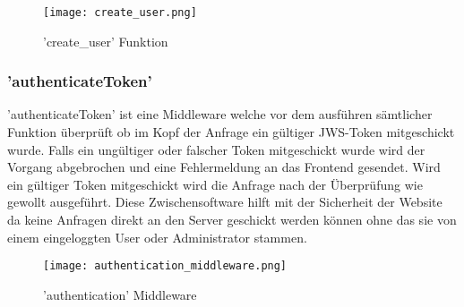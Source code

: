 		 		\begin{figure}[h]
		 			\centering
		 			\texttt{[image: create\_user.png]}
		 			\caption{'create\_user' Funktion}
		 		\end{figure}
		 		
		 	\subsubsection{'authenticateToken'}
		 		'authenticateToken' ist eine Middleware welche vor dem ausführen sämtlicher Funktion überprüft ob im Kopf der Anfrage ein gültiger JWS-Token mitgeschickt wurde. Falls ein ungültiger oder falscher Token mitgeschickt wurde wird der Vorgang abgebrochen und eine Fehlermeldung an das Frontend gesendet. Wird ein gültiger Token mitgeschickt wird die Anfrage nach der Überprüfung wie gewollt ausgeführt. Diese Zwischensoftware hilft mit der Sicherheit der Website da keine Anfragen direkt an den Server geschickt werden können ohne das sie von einem eingeloggten User oder Administrator stammen. 
		 		
		 		\begin{figure}[h]
		 			\centering
		 			\texttt{[image: authentication\_middleware.png]}
		 			\caption{'authentication' Middleware}
		 		\end{figure}